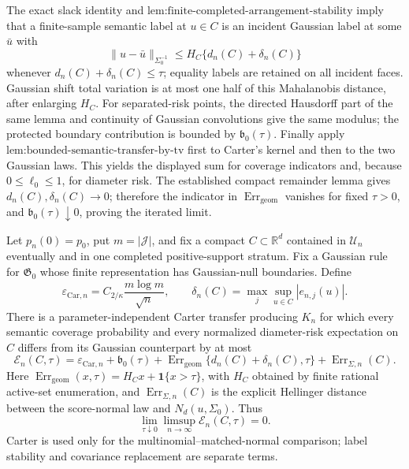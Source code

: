 The exact slack identity and \(\text{lem:finite-completed-arrangement-stability}\) imply that a finite-sample semantic label at \(u\in C\) is an incident Gaussian label at some \(\bar u\) with
\[
 \|u-\bar u\|_{\Sigma_0^{-1}}
 \le H_C\{d_n(C)+\delta_n(C)\}
\]
whenever \(d_n(C)+\delta_n(C)\le\tau\); equality labels are retained on all incident faces. Gaussian shift total variation is at most one half of this Mahalanobis distance, after enlarging \(H_C\). For separated-risk points, the directed Hausdorff part of the same lemma and continuity of Gaussian convolutions give the same modulus; the protected boundary contribution is bounded by \(\mathfrak b_0(\tau)\). Finally apply \(\text{lem:bounded-semantic-transfer-by-tv}\) first to Carter's kernel and then to the two Gaussian laws. This yields the displayed sum for coverage indicators and, because \(0\le\ell_0\le1\), for diameter risk. The established compact remainder lemma gives \(d_n(C),\delta_n(C)\to0\); therefore the indicator in \(\operatorname{Err}_{\mathrm{geom}}\) vanishes for fixed \(\tau>0\), and \(\mathfrak b_0(\tau)\downarrow0\), proving the iterated limit.

Let \(p_n(0)=p_0\), put \(m=|\mathcal J|\), and fix a compact \(C\subset\mathbb R^d\) contained in \(\mathcal U_n\) eventually and in one completed positive-support stratum. Fix a Gaussian rule for \(\mathfrak G_0\) whose finite representation has Gaussian-null boundaries. Define
\[
 \varepsilon_{\mathrm{Car},n}=C_{2/\kappa}\frac{m\log m}{\sqrt n},
 \qquad
 \delta_n(C)=\max_j\sup_{u\in C}|e_{n,j}(u)|.
\]
There is a parameter-independent Carter transfer producing \(K_n\) for which every semantic coverage probability and every normalized diameter-risk expectation on \(C\) differs from its Gaussian counterpart by at most
\[
 \mathcal E_n(C,\tau)=
 \varepsilon_{\mathrm{Car},n}+\mathfrak b_0(\tau)
 +\operatorname{Err}_{\mathrm{geom}}\{d_n(C)+\delta_n(C),\tau\}
 +\operatorname{Err}_{\Sigma,n}(C).
\]
Here \(\operatorname{Err}_{\mathrm{geom}}(x,\tau)=H_Cx+\mathbf 1\{x>\tau\}\), with \(H_C\) obtained by finite rational active-set enumeration, and \(\operatorname{Err}_{\Sigma,n}(C)\) is the explicit Hellinger distance between the score-normal law and \(N_d(u,\Sigma_0)\). Thus
\[
 \lim_{\tau\downarrow0}\limsup_{n\to\infty}\mathcal E_n(C,\tau)=0.
\]
Carter is used only for the multinomial--matched-normal comparison; label stability and covariance replacement are separate terms.

